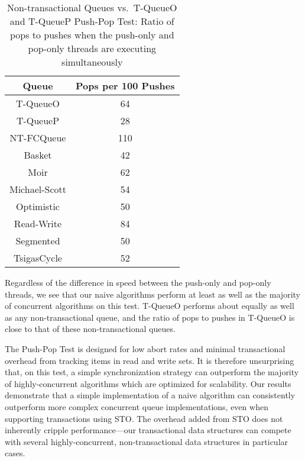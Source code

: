 \begin{table}[t]
        \centering
    \begin{tabular}{|cc|}
        \hline
        Queue & Pops per 100 Pushes\\
        \hline
            T-QueueO & 64\\
            T-QueueP & 28\\
            NT-FCQueue & 110\\
            Basket & 42\\
            Moir & 62\\
            Michael-Scott& 54\\
            Optimistic & 50\\
            Read-Write & 84\\
            Segmented & 50\\
            TsigasCycle & 52\\
        \hline
    \end{tabular}
    \caption{Non-transactional Queues vs.\ T-QueueO and T-QueueP Push-Pop Test: Ratio of pops to pushes when the push-only and pop-only threads are executing simultaneously}
    \label{tab:push_pop_ratio}
\end{table}

Regardless of the difference in speed between the push-only and pop-only threads, we see that our naive algorithms perform at least as well as the majority of concurrent algorithms on this test. 
T-QueueO performs about equally as well as any non-transactional queue, and the ratio of pops to pushes in T-QueueO is close to that of these non-transactional queues.

The Push-Pop Test is designed for low abort rates and minimal transactional overhead from tracking items in read and write sets. It is therefore unsurprising that, on this test, a simple synchronization strategy can outperform the majority of highly-concurrent algorithms which are optimized for scalability. 
Our results demonstrate that a simple implementation of a naive algorithm can consistently outperform more complex concurrent queue implementations, even when supporting transactions using STO. The overhead added from STO does not inherently cripple performance---our transactional data structures can compete with several highly-concurrent, non-transactional data structures in particular cases. 

\vspace{12pt}
\noindent{}


